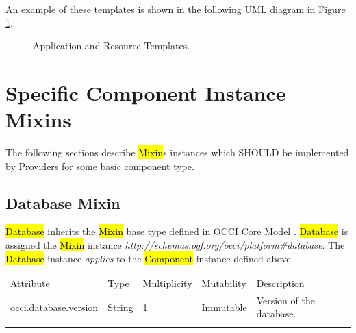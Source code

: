 \documentclass[10pt,a4paper]{article}
\begin{document}
An example of these templates is shown in the following UML diagram in Figure \ref{fig:templates}.

\begin{figure}[!h]
	{\centering {} \par}
	\caption{Application and Resource Templates.}
	\label{fig:templates}
\end{figure}

\section{Specific Component Instance Mixins}
The following sections describe \hl{Mixin}s instances which SHOULD be implemented by Providers for some basic component type.

\subsection{Database Mixin}

\hl{Database} inherits the \hl{Mixin} base type defined in OCCI Core Model \cite{occi:core}. \hl{Database} is assigned the \hl{Mixin} instance \textit{http://schemas.ogf.org/occi/platform\#database}. The \hl{Database} instance \textit{applies} to the \hl{Component} instance defined above.

{
	\begin{tabular}{lp{2.5cm}p{1cm}lp{5cm}}
	\toprule
	Attribute&Type&Multi\-plicity&Mutability&Description\\
	\colrule
	occi.database.version & String & 1 & Immutable & Version of the database.\\
	\botrule
	\end{tabular}
}
\end{document}
